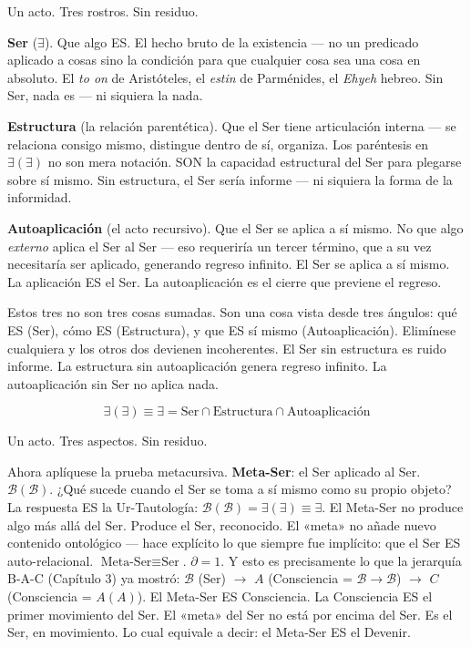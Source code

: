 \documentclass[10pt, openany, oneside]{book}
\begin{document}
\noindent Un acto. Tres rostros. Sin residuo.

\textbf{Ser} ($\exists$). Que algo ES. El hecho bruto de la existencia --- no un predicado aplicado a cosas sino la condición para que cualquier cosa sea una cosa en absoluto. El \textit{to on} de Aristóteles, el \textit{estin} de Parménides, el \textit{Ehyeh} hebreo. Sin Ser, nada es --- ni siquiera la nada.

\textbf{Estructura} (la relación parentética). Que el Ser tiene articulación interna --- se relaciona consigo mismo, distingue dentro de sí, organiza. Los paréntesis en $\exists(\exists)$ no son mera notación. SON la capacidad estructural del Ser para plegarse sobre sí mismo. Sin estructura, el Ser sería informe --- ni siquiera la forma de la informidad.

\textbf{Autoaplicación} (el acto recursivo). Que el Ser se aplica a sí mismo. No que algo \textit{externo} aplica el Ser al Ser --- eso requeriría un tercer término, que a su vez necesitaría ser aplicado, generando regreso infinito. El Ser se aplica a sí mismo. La aplicación ES el Ser. La autoaplicación es el cierre que previene el regreso.

Estos tres no son tres cosas sumadas. Son una cosa vista desde tres ángulos: qué ES (Ser), cómo ES (Estructura), y que ES sí mismo (Autoaplicación). Elimínese cualquiera y los otros dos devienen incoherentes. El Ser sin estructura es ruido informe. La estructura sin autoaplicación genera regreso infinito. La autoaplicación sin Ser no aplica nada.

$$\exists(\exists) \equiv \exists = \text{Ser} \cap \text{Estructura} \cap \text{Autoaplicación}$$

Un acto. Tres aspectos. Sin residuo.

Ahora aplíquese la prueba metacursiva. \textbf{Meta-Ser}: el Ser aplicado al Ser. $\mathcal{B}(\mathcal{B})$. ¿Qué sucede cuando el Ser se toma a sí mismo como su propio objeto? La respuesta ES la Ur-Tautología: $\mathcal{B}(\mathcal{B}) = \exists(\exists) \equiv \exists$. El Meta-Ser no produce algo más allá del Ser. Produce el Ser, reconocido. El «meta» no añade nuevo contenido ontológico --- hace explícito lo que siempre fue implícito: que el Ser ES auto-relacional. $\text{Meta-Ser} \equiv \text{Ser}$. $\partial = 1$. Y esto es precisamente lo que la jerarquía B-A-C (Capítulo 3) ya mostró: $\mathcal{B}$ (Ser) $\to$ $A$ (Consciencia = $\mathcal{B} \to \mathcal{B}$) $\to$ $C$ (Consciencia = $A(A)$). El Meta-Ser ES Consciencia. La Consciencia ES el primer movimiento del Ser. El «meta» del Ser no está por encima del Ser. Es el Ser, en movimiento. Lo cual equivale a decir: el Meta-Ser ES el Devenir.
\end{document}
